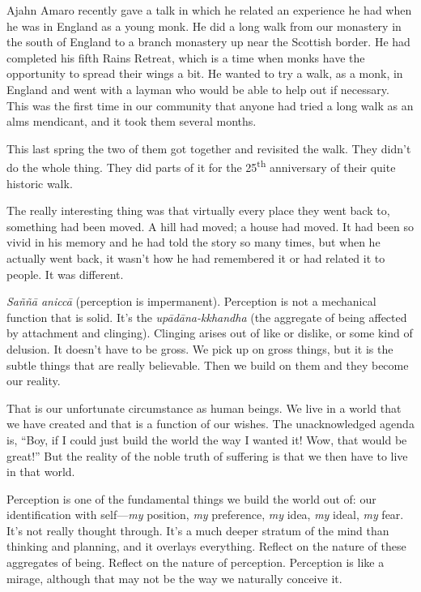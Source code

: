 Ajahn Amaro recently gave a talk in which he related an experience he
had when he was in England as a young monk. He did a long walk from our
monastery in the south of England to a branch monastery up near the
Scottish border. He had completed his fifth Rains Retreat, which is a
time when monks have the opportunity to spread their wings a bit. He
wanted to try a walk, as a monk, in England and went with a layman who
would be able to help out if necessary. This was the first time in our
community that anyone had tried a long walk as an alms mendicant, and it
took them several months.

This last spring the two of them got together and revisited the walk.
They didn’t do the whole thing. They did parts of it for the
25\textsuperscript{th} anniversary of their quite historic walk.

The really interesting thing was that virtually every place they went
back to, something had been moved. A hill had moved; a house had moved.
It had been so vivid in his memory and he had told the story so many
times, but when he actually went back, it wasn’t how he had remembered
it or had related it to people. It was different.

\emph{Saññā aniccā} (perception is impermanent). Perception is not a
mechanical function that is solid. It’s the \emph{upādāna-kkhandha} (the
aggregate of being affected by attachment and clinging). Clinging arises
out of like or dislike, or some kind of delusion. It doesn’t have to be
gross. We pick up on gross things, but it is the subtle things that are
really believable. Then we build on them and they become our reality.

That is our unfortunate circumstance as human beings. We live in a world
that we have created and that is a function of our wishes. The
unacknowledged agenda is, “Boy, if I could just build the world the way
I wanted it! Wow, that would be great!” But the reality of the noble
truth of suffering is that we then have to live in that world.

Perception is one of the fundamental things we build the world out of:
our identification with self—\emph{my} position, \emph{my} preference,
\emph{my} idea, \emph{my} ideal, \emph{my} fear. It’s not really thought
through. It’s a much deeper stratum of the mind than thinking and
planning, and it overlays everything. Reflect on the nature of these
aggregates of being. Reflect on the nature of perception. Perception is
like a mirage, although that may not be the way we naturally conceive
it.

